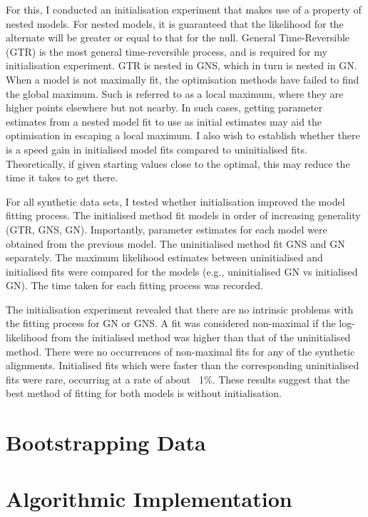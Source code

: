 For this, I conducted an initialisation experiment that makes use of a property of \gls{nested} models. For nested models, it is guaranteed that the likelihood for the alternate will be greater or equal to that for the null. General Time-Reversible (GTR) is the most general time-reversible process, and is required for my initialisation experiment. GTR is nested in GNS, which in turn is nested in GN. When a model is not maximally fit, the optimisation methods have failed to find the global maximum. Such is referred to as a local maximum, where they are higher points elsewhere but not nearby. In such cases, getting parameter estimates from a nested model fit to use as initial estimates may aid the optimisation in escaping a local maximum. I also wish to establish whether there is a speed gain in initialised model fits compared to uninitialised fits. Theoretically, if given starting values close to the optimal, this may reduce the time it takes to get there. 

For all synthetic data sets, I tested whether initialisation improved the model fitting process. The initialised method fit models in order of increasing generality (GTR, GNS, GN). Importantly, parameter estimates for each model were obtained from the previous model. The uninitialised method fit GNS and GN separately. The maximum likelihood estimates between uninitialised and initialised fits were compared for the models (e.g., uninitialised GN vs initialised GN). The time taken for each fitting process was recorded.  

The initialisation experiment revealed that there are no intrinsic problems with the fitting process for GN or GNS. A fit was considered non-maximal if the log-likelihood from the initialised method was higher than that of the uninitialised method. There were no occurrences of non-maximal fits for any of the synthetic alignments. Initialised fits which were faster than the corresponding uninitialised fits were rare, occurring at a rate of about ~1\%. These results suggest that the best method of fitting for both models is without initialisation. 



\section{Bootstrapping Data}




\section{Algorithmic Implementation}

